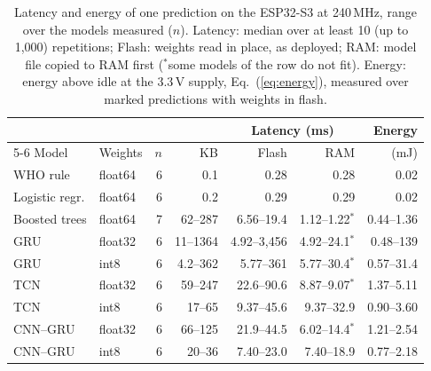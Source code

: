 \begin{table}[t]
\centering
\caption{Latency and energy of one prediction on the ESP32-S3 at 240\,MHz, range over the models measured ($n$). Latency: median over at least 10 (up to 1{,}000) repetitions; Flash: weights read in place, as deployed; RAM: model file copied to RAM first ($^{*}$some models of the row do not fit). Energy: energy above idle at the 3.3\,V supply, Eq.~(\ref{eq:energy}), measured over marked predictions with weights in flash.}
\label{tab:latency}
\footnotesize
\setlength{\tabcolsep}{3pt}
\begin{tabular}{llrrrrr}
\toprule
 & & & & \multicolumn{2}{c}{Latency (ms)} & Energy \\
\cmidrule(lr){5-6}
Model & Weights & $n$ & KB & Flash & RAM & (mJ) \\
\midrule
WHO rule & float64 & 6 & 0.1 & 0.28 & 0.28 & 0.02 \\
Logistic regr. & float64 & 6 & 0.2 & 0.29 & 0.29 & 0.02 \\
Boosted trees & float64 & 7 & 62--287 & 6.56--19.4 & 1.12--1.22$^{*}$ & 0.44--1.36 \\
GRU & float32 & 6 & 11--1364 & 4.92--3{,}456 & 4.92--24.1$^{*}$ & 0.48--139 \\
GRU & int8 & 6 & 4.2--362 & 5.77--361 & 5.77--30.4$^{*}$ & 0.57--31.4 \\
TCN & float32 & 6 & 59--247 & 22.6--90.6 & 8.87--9.07$^{*}$ & 1.37--5.11 \\
TCN & int8 & 6 & 17--65 & 9.37--45.6 & 9.37--32.9 & 0.90--3.60 \\
CNN--GRU & float32 & 6 & 66--125 & 21.9--44.5 & 6.02--14.4$^{*}$ & 1.21--2.54 \\
CNN--GRU & int8 & 6 & 20--36 & 7.40--23.0 & 7.40--18.9 & 0.77--2.18 \\
\bottomrule
\end{tabular}
\end{table}
